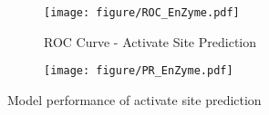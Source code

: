 \begin{figure}[h]
  \centering
  \begin{subfigure}{0.48\textwidth}
    \texttt{[image: figure/ROC\_EnZyme.pdf]}
    \caption{ROC Curve - Activate Site Prediction}
  \end{subfigure}
  \begin{subfigure}{0.48\textwidth}
    \texttt{[image: figure/PR\_EnZyme.pdf]}
  \end{subfigure}

    \caption{Model performance of activate site prediction}
  \label{fig:Activate Site ROCPR}
\end{figure}

